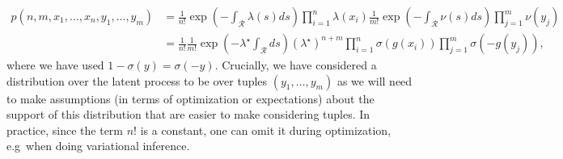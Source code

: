 \documentclass{article}
\newcommand{\calR}{\mathcal{R}}
\newcommand{\ls}{\lambda(s)}
\newcommand{\ns}{\nu(s)}
\newcommand{\sigmoid}{\sigma}
\begin{document}
	 \begin{align}
	 p(n, m, x_1, \ldots, x_n, y_1, \ldots, y_m) &= 	\frac{1}{n!} \exp\left(-\int_{\calR} \ls ds\right) \prod_{i=1}^{n}  {\lambda(x_i)} 	\frac{1}{m!} \exp\left(-\int_{\calR} \ns ds\right) \prod_{j=1}^{m}  {\nu(y_j)}  \\
	 &= \frac{1}{n!} \frac{1}{m!}  \exp \left(- \lambda^{\star} \int_{\calR} ds \right) (\lambda^{\star})^{n+m} \prod_{i=1}^{n}  \sigma(g(x_i)) \prod_{j=1}^{m} \sigma(- g(y_j)) ,
	 \end{align}
	  where we have used $1 - \sigmoid(y) = \sigmoid(-y)$. Crucially, we have considered a distribution over the latent process to be over tuples $(y_1, \ldots, y_m)$ as we will need to make assumptions (in terms of optimization or expectations) about the support of this distribution that are easier to make considering tuples. In practice, since the term $n!$ is a constant, one can omit it during optimization, e.g~when doing variational inference. 
	  
\end{document}
